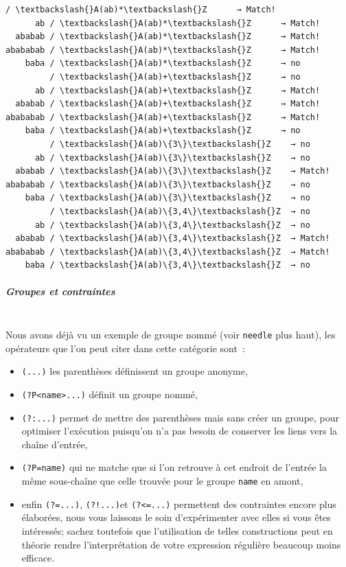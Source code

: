     \begin{Verbatim}[commandchars=\\\{\}]
         / \textbackslash{}A(ab)*\textbackslash{}Z      → Match!
      ab / \textbackslash{}A(ab)*\textbackslash{}Z      → Match!
  ababab / \textbackslash{}A(ab)*\textbackslash{}Z      → Match!
abababab / \textbackslash{}A(ab)*\textbackslash{}Z      → Match!
    baba / \textbackslash{}A(ab)*\textbackslash{}Z      → no
         / \textbackslash{}A(ab)+\textbackslash{}Z      → no
      ab / \textbackslash{}A(ab)+\textbackslash{}Z      → Match!
  ababab / \textbackslash{}A(ab)+\textbackslash{}Z      → Match!
abababab / \textbackslash{}A(ab)+\textbackslash{}Z      → Match!
    baba / \textbackslash{}A(ab)+\textbackslash{}Z      → no
         / \textbackslash{}A(ab)\{3\}\textbackslash{}Z    → no
      ab / \textbackslash{}A(ab)\{3\}\textbackslash{}Z    → no
  ababab / \textbackslash{}A(ab)\{3\}\textbackslash{}Z    → Match!
abababab / \textbackslash{}A(ab)\{3\}\textbackslash{}Z    → no
    baba / \textbackslash{}A(ab)\{3\}\textbackslash{}Z    → no
         / \textbackslash{}A(ab)\{3,4\}\textbackslash{}Z  → no
      ab / \textbackslash{}A(ab)\{3,4\}\textbackslash{}Z  → no
  ababab / \textbackslash{}A(ab)\{3,4\}\textbackslash{}Z  → Match!
abababab / \textbackslash{}A(ab)\{3,4\}\textbackslash{}Z  → Match!
    baba / \textbackslash{}A(ab)\{3,4\}\textbackslash{}Z  → no

    \end{Verbatim}

    \hypertarget{groupes-et-contraintes}{%
\subparagraph{Groupes et contraintes\\\\}\label{groupes-et-contraintes}}

    Nous avons déjà vu un exemple de groupe nommé (voir \texttt{needle} plus
haut), les opérateurs que l'on peut citer dans cette catégorie sont~:

\begin{itemize}
	\item 
	\texttt{(...)} les parenthèses définissent un groupe anonyme,
	\item
	\texttt{(?P\textless{}name\textgreater{}...)} définit un groupe nommé,
	\item
	\texttt{(?:...)} permet de mettre des parenthèses mais sans créer un
	groupe, pour optimiser l'exécution puisqu'on n'a pas besoin de conserver
	les liens vers la chaîne d'entrée,
	\item
	\texttt{(?P=name)} qui ne matche
	que si l'on retrouve à cet endroit de l'entrée la même sous-chaîne que
	celle trouvée pour le groupe \texttt{name} en amont,
	\item
	enfin \texttt{(?=...)}, \texttt{(?!...)}et \texttt{(?\textless{}=...)}
	permettent des contraintes encore plus élaborées, nous vous laissons le
	soin d'expérimenter avec elles si vous êtes intéressés; sachez toutefois
	que l'utilisation de telles constructions peut en théorie rendre
	l'interprétation de votre expression régulière beaucoup moins efficace.
\end{itemize}

